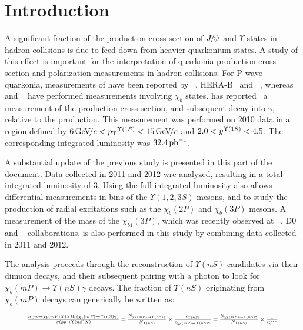 \section{Introduction}
\label{sec:introduction}

A significant fraction of the production cross-section of ${J\mskip -3mu/\mskip -2mu\psi\mskip 2mu}$ and
$\Upsilon$ states in hadron collisions is due to feed-down from heavier
quarkonium states. A study of this effect is important for the interpretation of
quarkonia production cross-section and polarization measurements in hadron
collisions. For P-wave quarkonia, measurements of \chic have been reported by
\cdf~\cite{Abulencia:2007bra}, HERA-B~\cite{Abt:2008ed}
and \lhcb~\cite{LHCb-PAPER-2011-019}, whereas \cdf~\cite{Affolder:1999wm} and 
\atlas~\cite{Aad:2011ih} have performed measurements involving $\chi_b$ states.
\lhcb has reported~\cite{LHCb-PAPER-2012-015} a measurement of
the \chibOneP production cross-section, and subsequent decay into \OneS $\gamma$,
relative to the \OneS production. This measurement was performed on 2010 data
in a region defined by $6 \gevc < \pt^{\Y1S} < 15 \gevc$ and
$2.0 < y^{\Y1S} < 4.5$. The corresponding integrated luminosity was $32.4\mbox{\,pb}^{-1}$.

A substantial update of the previous \lhcb study is presented in this part of
the document. Data collected in 2011 and 2012 wre analyzed, resulting in a total
integrated luminosity of 3\invfb. Using the full integrated luminosity also allows
differential measurements in \pt bins of the $\Upsilon(1,2,3S)$ mesons, and to
study the production of radial excitations such as the $\chi_b(2P)$ and
$\chi_b(3P)$ mesons. A measurement of the mass of the $\chi_{b1}(3P)$, which was recently
observed at \atlas~\cite{Aad:2011ih}, D0~\cite{Abazov:2012gh} and
\lhcb~\cite{LHCb-CONF-2012-020} collaborations, is also performed in this study by
combining data collected in 2011 and 2012.

The analysis proceeds through the reconstruction of $\Upsilon(nS)$ candidates
via their dimuon decays, and their subsequent pairing with a photon to look for
$\chi_b(mP) \to \Upsilon(nS) \gamma$ decays.  The fraction of $\Upsilon(nS)$
originating from $\chi_b(mP)$ decays can generically be written as:

\begin{equation}
\resizebox{.9\hsize}{!}{
$
\frac{\sigma(pp \to \chi_b (mP) X) \times Br (\chi_b (mP) \to \Upsilon(nS) \gamma)}{\sigma(pp \to \Upsilon(nS) X)} =
\frac{N_{\chi_b (mP)\to \Upsilon(nS) \gamma}}{N_{\Upsilon(nS)}} \times \frac{\epsilon_{\Upsilon(nS)}}{\epsilon_{\chi_b (mP)\to \Upsilon(nS) \gamma}} =
\frac{N_{\chi_b (mP)\to \Upsilon(nS) \gamma}}{N_{\Upsilon(nS)}} \times \frac{1}{\epsilon^{reco}_{\gamma}}
$
}
\label{eqn:master}
\end{equation}



